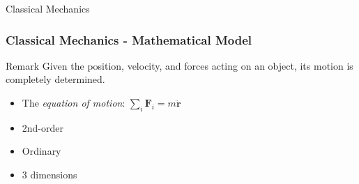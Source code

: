 \documentclass{beamer}
\begin{document}
\begin{frame}

    \begin{block}{}
        \centering \Large Classical Mechanics
    \end{block}

\end{frame}

\begin{frame}
    \frametitle{Classical Mechanics - Mathematical Model}
    \begin{block}{Remark}
        Given the position, velocity, and forces acting on an object, its motion is completely determined.
    \end{block}
    \begin{itemize}
        \item The \emph{equation of motion}: $\sum_i \mathbf{F}_i = m \ddot{\mathbf{r}}$
        \item 2nd-order
        \item Ordinary
        \item 3 dimensions
    \end{itemize}
\end{frame}
\end{document}
